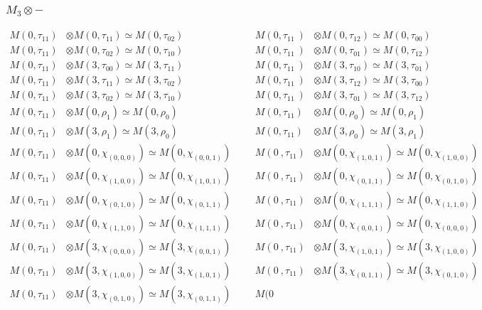 \subsubsection{$M_3\otimes -$}
\begin{align*}
M(0,\tau_{11}) &\otimes M(0,\tau_{11}) \simeq M(0,\tau_{02}) &&& M(0,\tau_{11}\
) &\otimes M(0,\tau_{12}) \simeq M(0,\tau_{00})\\
M(0,\tau_{11}) &\otimes M(0,\tau_{02}) \simeq M(0,\tau_{10}) &&& M(0,\tau_{11}\
) &\otimes M(0,\tau_{01}) \simeq M(0,\tau_{12})\\
M(0,\tau_{11}) &\otimes M(3,\tau_{00}) \simeq M(3,\tau_{11}) &&& M(0,\tau_{11}\
) &\otimes M(3,\tau_{10}) \simeq M(3,\tau_{01})\\
M(0,\tau_{11}) &\otimes M(3,\tau_{11}) \simeq M(3,\tau_{02}) &&& M(0,\tau_{11}\
) &\otimes M(3,\tau_{12}) \simeq M(3,\tau_{00})\\
M(0,\tau_{11}) &\otimes M(3,\tau_{02}) \simeq M(3,\tau_{10}) &&& M(0,\tau_{11}\
) &\otimes M(3,\tau_{01}) \simeq M(3,\tau_{12})\\
M(0,\tau_{11}) &\otimes M(0,\rho_{1}) \simeq M(0,\rho_{0}) &&& M(0,\tau_{11}) \
&\otimes M(0,\rho_{0}) \simeq M(0,\rho_{1})\\
M(0,\tau_{11}) &\otimes M(3,\rho_{1}) \simeq M(3,\rho_{0}) &&& M(0,\tau_{11}) \
&\otimes M(3,\rho_{0}) \simeq M(3,\rho_{1})\\
M(0,\tau_{11}) &\otimes M(0,\chi_{(0,0,0)}) \simeq M(0,\chi_{(0,0,1)}) &&& M(0\
,\tau_{11}) &\otimes M(0,\chi_{(1,0,1)}) \simeq M(0,\chi_{(1,0,0)})\\
M(0,\tau_{11}) &\otimes M(0,\chi_{(1,0,0)}) \simeq M(0,\chi_{(1,0,1)}) &&& M(0\
,\tau_{11}) &\otimes M(0,\chi_{(0,1,1)}) \simeq M(0,\chi_{(0,1,0)})\\
M(0,\tau_{11}) &\otimes M(0,\chi_{(0,1,0)}) \simeq M(0,\chi_{(0,1,1)}) &&& M(0\
,\tau_{11}) &\otimes M(0,\chi_{(1,1,1)}) \simeq M(0,\chi_{(1,1,0)})\\
M(0,\tau_{11}) &\otimes M(0,\chi_{(1,1,0)}) \simeq M(0,\chi_{(1,1,1)}) &&& M(0\
,\tau_{11}) &\otimes M(0,\chi_{(0,0,1)}) \simeq M(0,\chi_{(0,0,0)})\\
M(0,\tau_{11}) &\otimes M(3,\chi_{(0,0,0)}) \simeq M(3,\chi_{(0,0,1)}) &&& M(0\
,\tau_{11}) &\otimes M(3,\chi_{(1,0,1)}) \simeq M(3,\chi_{(1,0,0)})\\
M(0,\tau_{11}) &\otimes M(3,\chi_{(1,0,0)}) \simeq M(3,\chi_{(1,0,1)}) &&& M(0\
,\tau_{11}) &\otimes M(3,\chi_{(0,1,1)}) \simeq M(3,\chi_{(0,1,0)})\\
M(0,\tau_{11}) &\otimes M(3,\chi_{(0,1,0)}) \simeq M(3,\chi_{(0,1,1)}) &&& M(0\

\end{align*}
